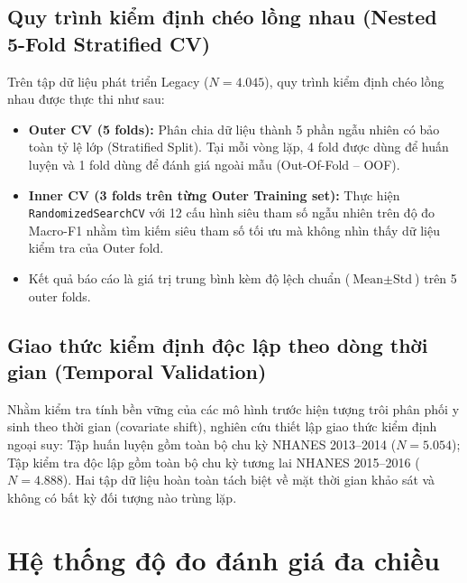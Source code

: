 \subsection{Quy trình kiểm định chéo lồng nhau (Nested 5-Fold Stratified CV)}
\label{subsec:nested-cv-protocol}

Trên tập dữ liệu phát triển Legacy ($N = 4.045$), quy trình kiểm định chéo lồng nhau được thực thi như sau:
\begin{itemize}
    \item \textbf{Outer CV (5 folds):} Phân chia dữ liệu thành 5 phần ngẫu nhiên có bảo toàn tỷ lệ lớp (Stratified Split). Tại mỗi vòng lặp, 4 fold được dùng để huấn luyện và 1 fold dùng để đánh giá ngoài mẫu (Out-Of-Fold -- OOF).
    \item \textbf{Inner CV (3 folds trên từng Outer Training set):} Thực hiện \texttt{RandomizedSearchCV} với 12 cấu hình siêu tham số ngẫu nhiên trên độ đo Macro-F1 nhằm tìm kiếm siêu tham số tối ưu mà không nhìn thấy dữ liệu kiểm tra của Outer fold.
    \item Kết quả báo cáo là giá trị trung bình kèm độ lệch chuẩn ($\text{Mean} \pm \text{Std}$) trên 5 outer folds.
\end{itemize}

\subsection{Giao thức kiểm định độc lập theo dòng thời gian (Temporal Validation)}
\label{subsec:temporal-protocol}

Nhằm kiểm tra tính bền vững của các mô hình trước hiện tượng trôi phân phối y sinh theo thời gian (covariate shift), nghiên cứu thiết lập giao thức kiểm định ngoại suy: Tập huấn luyện gồm toàn bộ chu kỳ NHANES 2013--2014 ($N = 5.054$); Tập kiểm tra độc lập gồm toàn bộ chu kỳ tương lai NHANES 2015--2016 ($N = 4.888$). Hai tập dữ liệu hoàn toàn tách biệt về mặt thời gian khảo sát và không có bất kỳ đối tượng nào trùng lặp.

\section{Hệ thống độ đo đánh giá đa chiều}
\label{sec:he-thong-do-do}

